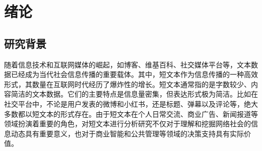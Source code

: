 \chapter{绪论}\label{chap:intro}
\section{研究背景}\label{sec:background}
随着信息技术和互联网媒体的崛起，如博客、维基百科、社交媒体平台等，文本数据已经成为当代社会信息传播的重要载体。其中，短文本作为信息传播的一种高效形式，其数量在互联网时代经历了爆炸性的增长。短文本通常指的是字数较少、内容简洁的文本数据。它们的主要特点是信息量密集，但表达形式极为简洁。比如在社交平台中，不论是用户发表的微博和小红书，还是标题、弹幕以及评论等，绝大多数都以短文本的形式存在。由于短文本在个人日常交流、商业广告、新闻报道等领域扮演着重要的角色，对短文本进行分析研究不仅对于理解和挖掘网络社会的信息动态具有重要意义，也对于商业智能和公共管理等领域的决策支持具有实际价值。

